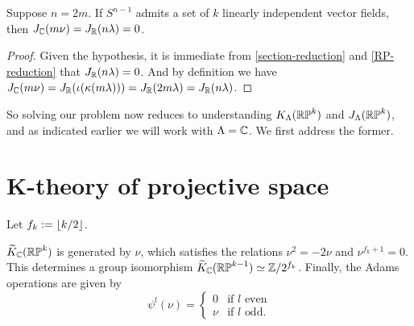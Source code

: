 \begin{lemma}
  \label{j-reduction}
  Suppose $n = 2m$. If $S^{n-1}$ admits a set of $k$ linearly
  independent vector fields, then $J_{\mathbb{C}}(m\nu) = J_{\mathbb{R}}(n\lambda) = 0$.
\end{lemma}

\begin{proof}
  Given the hypothesis, it is immediate from \eqref{section-reduction}
  and \eqref{RP-reduction} that $J_{\mathbb{R}}(n\lambda) = 0$. And by
  definition we have $J_{\mathbb{C}}(m\nu) = J_{\mathbb{R}}(\iota(\kappa(m\lambda))) =
  J_{\mathbb{R}}(2m\lambda) = J_{\mathbb{R}}(n\lambda)$.
\end{proof}

So solving our problem now reduces to understanding
$K_\Lambda(\mathbb{RP}^k)$ and $J_\Lambda(\mathbb{RP}^k)$, and as indicated earlier
we will work with $\Lambda = \mathbb{C}$. We first address the former.


\section{K-theory of projective space}

\begin{notation}
  \label{kthy-order}
  Let $f_k \mathrel{:=} \lfloor k/2 \rfloor$.
\end{notation}

\begin{theorem}
  \label{RP-kthy}
  $\widetilde K_{\mathbb{C}}(\mathbb{RP}^k)$ is generated by $\nu$, which satisfies the
  relations $\nu^2 = -2\nu$ and $\nu^{f_k+1} = 0$. This determines a
  group isomorphism $\widetilde K_{\mathbb{C}}(\mathbb{RP}^{k-1}) \simeq \mathbb{Z}/2^{f_k}$.  Finally,
  the Adams operations are given by
  \[
  \psi^l(\nu) =
  \begin{cases}
    0 & \text{if }l\text{ even} \\
    \nu & \text{if }l\text{ odd}.
  \end{cases}
  \]
\end{theorem}

